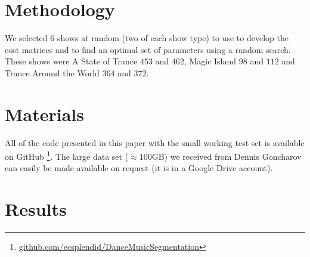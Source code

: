 \documentclass[twocolumn]{article}
\begin{document}
\section{Methodology}\label{sec:methodology}

We selected $6$ shows at random (two of each show type) to use to develop the cost matrices and to find an optimal set of parameters using a random search. These shows were A State of Trance $453$ and $462$, Magic Island $98$ and $112$ and Trance Around the World $364$ and $372$.



\section{Materials}\label{sec:materials}

All of the code presented in this paper with the small working test set is available on GitHub \footnote{\url{github.com/ecsplendid/DanceMusicSegmentation}}. The large data set ($\approx100$GB) we received from Dennis Goncharov can easily be made available on request (it is in a Google Drive account).

\section{Results}\label{sec:results}
\end{document}
